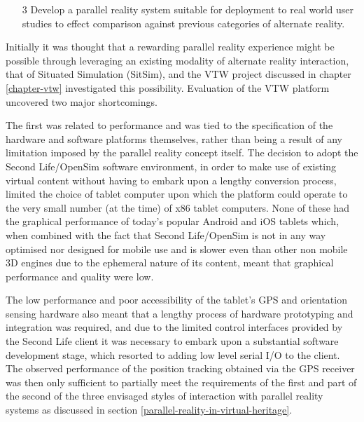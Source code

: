 \begin{enumerate}
	\item[3] Develop a parallel reality system suitable for deployment to real world user studies to effect comparison against previous categories of alternate reality.
\end{enumerate}

Initially it was thought that a rewarding parallel reality experience might be possible through leveraging an existing modality of alternate reality interaction, that of Situated Simulation (SitSim), and the VTW project discussed in chapter \ref{chapter-vtw} investigated this possibility. Evaluation of the VTW platform uncovered two major shortcomings.

The first was related to performance and was tied to the specification of the hardware and software platforms themselves, rather than being a result of any limitation imposed by the parallel reality concept itself. The decision to adopt the Second Life/OpenSim software environment, in order to make use of existing virtual content without having to embark upon a lengthy conversion process, limited the choice of tablet computer upon which the platform could operate to the very small number (at the time) of x86 tablet computers. None of these had the graphical performance of today's popular Android and iOS tablets which, when combined with the fact that Second Life/OpenSim is not in any way optimised nor designed for mobile use and is slower even than other non mobile 3D engines due to the ephemeral nature of its content, meant that graphical performance and quality were low.

The low performance and poor accessibility of the tablet's GPS and orientation sensing hardware also meant that a lengthy process of hardware prototyping and integration was required, and due to the limited control interfaces provided by the Second Life client it was necessary to embark upon a substantial software development stage, which resorted to adding low level serial I/O to the client. The observed performance of the position tracking obtained via the GPS receiver was then only sufficient to partially meet the requirements of the first and part of the second of the three envisaged styles of interaction with parallel reality systems as discussed in section \ref{parallel-reality-in-virtual-heritage}.

